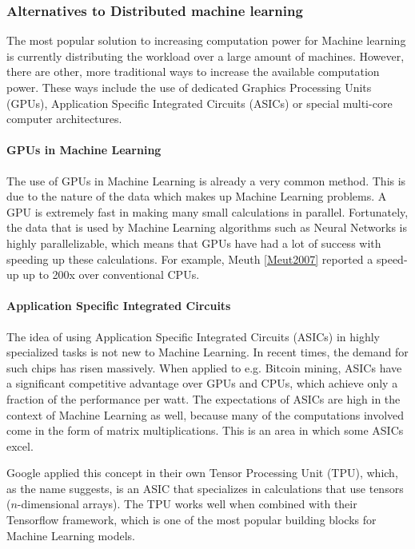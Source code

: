 
\subsubsection{Alternatives to Distributed machine learning}
The most popular solution to increasing computation power for Machine
learning is currently distributing the workload over a large amount of machines. However, there are other, more traditional ways to increase the available computation power. These ways include the use of dedicated Graphics Processing Units (GPUs), Application Specific Integrated Circuits (ASICs) or special multi-core computer architectures.

\paragraph{GPUs in Machine Learning}
The use of GPUs in Machine Learning is already a very common method. This is due to the nature of the data which makes up Machine Learning problems. A GPU is extremely fast in making many small calculations in parallel. Fortunately, the data that is used by Machine Learning algorithms such as Neural Networks is highly parallelizable, which means that GPUs have had a lot of success with speeding up these calculations. For example, Meuth \ref{Meut2007} reported a speed-up up to 200x over conventional CPUs.

\paragraph{Application Specific Integrated Circuits}
The idea of using Application Specific Integrated Circuits (ASICs) in highly specialized tasks is not new to Machine Learning. In recent times, the demand for such chips has risen massively\cite{Metz18}.
When applied to e.g. Bitcoin mining, ASICs have a significant competitive advantage over GPUs and CPUs, which achieve only a fraction of the performance per watt. The expectations of ASICs are high in the context of Machine Learning as well, because many of the computations involved come in the form of matrix multiplications. This is an area in which some ASICs excel.

Google applied this concept in their own Tensor Processing Unit (TPU)\cite{Sato17}, which, as the name suggests, is an ASIC that specializes in calculations that use tensors ($n$-dimensional arrays). The TPU works well when combined with their Tensorflow\cite{Tensorflow2015}\cite{Tensorflow2016} framework, which is one of the most popular building blocks for Machine Learning models.

